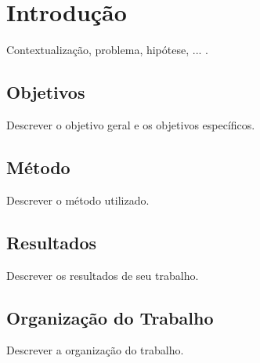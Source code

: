 \chapter[Introdução]{Introdução}

Contextualização, problema, hipótese, ... \cite{EIA649B}.

\section{Objetivos}
Descrever o objetivo geral e os objetivos específicos.

\section{Método}
Descrever o método utilizado.

\section{Resultados}
Descrever os resultados de seu trabalho.

\section{Organização do Trabalho}
Descrever a organização do trabalho.